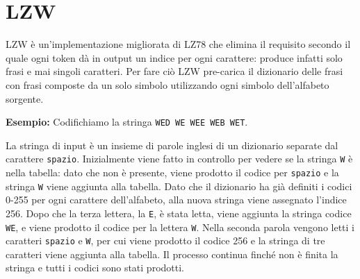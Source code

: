 \section{LZW}
LZW è un'implementazione migliorata di LZ78 che elimina il requisito secondo il quale ogni token dà in output un indice per ogni carattere: produce infatti solo frasi e mai singoli caratteri. Per fare ciò LZW pre-carica il dizionario delle frasi con frasi composte da un solo simbolo utilizzando ogni simbolo dell'alfabeto sorgente.

\vspace{5mm}

\textbf{Esempio:}  Codifichiamo la stringa \texttt{WED WE WEE WEB WET}.

La stringa di input è un insieme di parole inglesi di un dizionario separate dal carattere \texttt{spazio}.
Inizialmente viene fatto in controllo per vedere se la stringa \texttt{W} è nella tabella: dato che non è presente, viene prodotto il codice per \texttt{spazio} e la stringa \texttt{W} viene aggiunta alla tabella. Dato che il dizionario ha già definiti i codici 0-255 per ogni carattere dell'alfabeto, alla nuova stringa viene assegnato l'indice 256. Dopo che la terza lettera, la \texttt{E}, è stata letta, viene aggiunta la stringa codice \texttt{WE}, e viene prodotto il codice per la lettera \texttt{W}. Nella seconda parola vengono letti i caratteri \texttt{spazio} e \texttt{W}, per cui viene prodotto il codice 256 e la stringa di tre caratteri viene aggiunta alla tabella. Il processo continua finché non è finita la stringa e tutti i codici sono stati prodotti.

